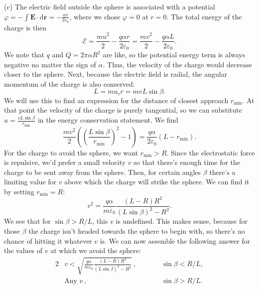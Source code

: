 \documentclass[../TST.tex]{subfiles}
\begin{document}
\begin{solution}
(c) The electric field outside the sphere is associated with a potential $\varphi=-\int \mathbf{E}\cdot \mathrm{d}\mathbf{r}=-\frac{\alpha r}{2\varepsilon_0}$, where we chose $\varphi=0$ at $r=0$. The total energy of the charge is then 
\begin{equation*}
	\mathcal{E}=\frac{mu^2}{2}-\frac{q\alpha r}{2\varepsilon_0}=\frac{mv^2}{2}-\frac{q\alpha L}{2\varepsilon_0}
.
\end{equation*}
We note that $q$ and $Q=2\pi\alpha R^2$ are like, so the potential energy term is always negative no matter the sign of $\alpha$. Thus, the velocity of the charge would decrease closer to the sphere. Next, because the electric field is radial, the angular momentum of the charge is also conserved:
\begin{equation*}
	L=mu_\tau r=mvL\sin{\beta}
.
\end{equation*}
We will use this to find an expression for the distance of closest approach $r_\mathrm{min}$. At that point the velocity of the charge is purely tangential, so we can substitute $u=\frac{vL\sin{\beta}}{r_\mathrm{min}}$ in the energy conservation statement. We find
\begin{equation*}
\frac{mv^2}{2}\left(\left(\frac{L\sin\beta}{r_\mathrm{min}}\right)^2-1\right) = \frac{q\alpha}{2\varepsilon_0}(L-r_\mathrm{min})
.
\end{equation*}
For the charge to avoid the sphere, we want $r_\mathrm{min}>R$. Since the electrostatic force is repulsive, we'd prefer a small velocity $v$ so that there's enough time for the charge to be sent away from the sphere. Then, for certain angles $\beta$ there's a limiting value for $v$ above which the charge will strike the sphere. We can find it by setting $r_\mathrm{min}=R$:
\begin{equation*}
	v^2=\frac{q\alpha}{m\varepsilon_0}\frac{(L-R)R^2}{(L\sin{\beta})^2-R^2}
.
\end{equation*}
We see that for $\sin{\beta}>R/L$, this $v$ is undefined. This makes sense, because for those $\beta$ the charge isn't headed towards the sphere to begin with, so there's no chance of hitting it whatever $v$ is. We can now assemble the following answer for the values of $v$ at which we avoid the sphere:
\begin{alignat*}{2}
		&\boxed{v<\sqrt{\frac{q\alpha}{m\varepsilon_0}\frac{(L-R)R^2}{(L\sin{\beta})^2-R^2}}}\,, \quad\quad &&\sin{\beta}<R/L,\\[5pt]
	&\boxed{\mathrm{Any}\,\,v}\,, &&\sin\beta>R/L.
\end{alignat*}

\end{solution}
\fi
\ifprob 
	\clearpage
\else 
	\clearpage
\fi
\end{document}
